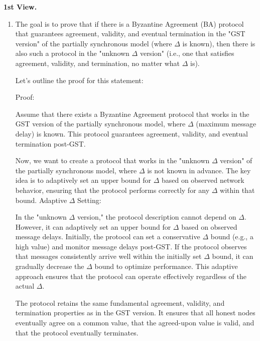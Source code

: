 \documentclass{article}
\begin{document}
\textbf{1st View.}

\begin{enumerate}

\item %

The goal is to prove that if there is a Byzantine Agreement (BA) protocol that guarantees agreement, validity, and eventual termination in the "GST version" of the partially synchronous model (where $\Delta$ is known), then there is also such a protocol in the "unknown $\Delta$ version" (i.e., one that satisfies agreement, validity, and termination, no matter what $\Delta$ is).

Let's outline the proof for this statement:

Proof:


Assume that there exists a Byzantine Agreement protocol that works in the GST version of the partially synchronous model, where $\Delta$ (maximum message delay) is known.
This protocol guarantees agreement, validity, and eventual termination post-GST.

Now, we want to create a protocol that works in the "unknown $\Delta$ version" of the partially synchronous model, where $\Delta$ is not known in advance.
The key idea is to adaptively set an upper bound for $\Delta$ based on observed network behavior, ensuring that the protocol performs correctly for any $\Delta$ within that bound.
Adaptive $\Delta$ Setting:

In the "unknown $\Delta$ version," the protocol description cannot depend on $\Delta$. However, it can adaptively set an upper bound for $\Delta$ based on observed message delays.
Initially, the protocol can set a conservative $\Delta$ bound (e.g., a high value) and monitor message delays post-GST.
If the protocol observes that messages consistently arrive well within the initially set $\Delta$ bound, it can gradually decrease the $\Delta$ bound to optimize performance.
This adaptive approach ensures that the protocol can operate effectively regardless of the actual $\Delta$.

The protocol retains the same fundamental agreement, validity, and termination properties as in the GST version.
It ensures that all honest nodes eventually agree on a common value, that the agreed-upon value is valid, and that the protocol eventually terminates.


\end{enumerate}
\end{document}
